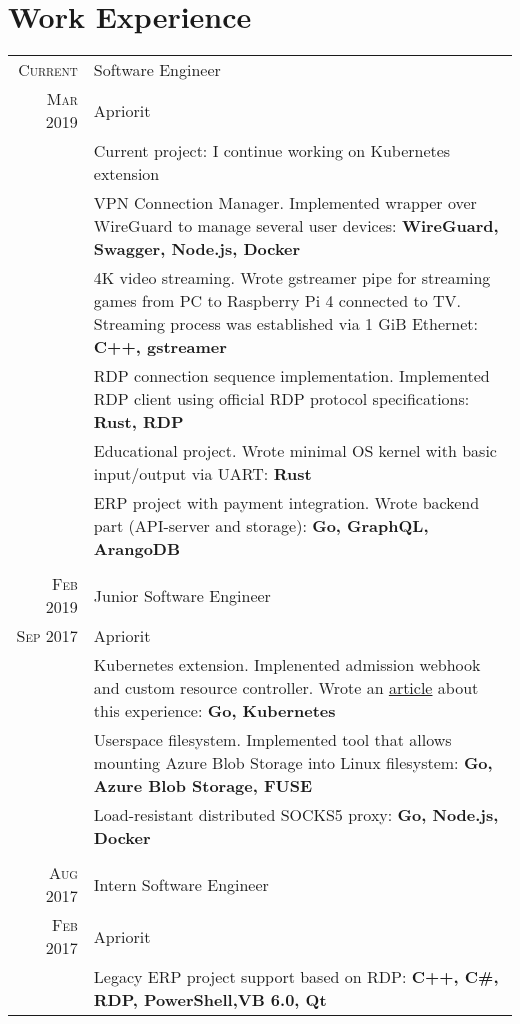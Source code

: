 \documentclass[a4paper,10pt]{article}
\begin{document}
\section{Work Experience}
\begin{tabular}{r|p{11cm}}
\textsc{Current}    & Software Engineer \\
\textsc{Mar} 2019   & Apriorit \\
                    & \footnotesize{Current project: I continue working on Kubernetes extension} \\
                    & \footnotesize{VPN Connection Manager. Implemented wrapper over WireGuard to manage several user devices: \textbf{WireGuard, Swagger, Node.js, Docker}} \\
                    & \footnotesize{4K video streaming. Wrote gstreamer pipe for streaming games from PC to Raspberry Pi 4 connected to TV. Streaming process was established via 1 GiB Ethernet: \textbf{C++, gstreamer}} \\
                    & \footnotesize{RDP connection sequence implementation. Implemented RDP client using official RDP protocol specifications: \textbf{Rust, RDP}} \\    
                    & \footnotesize{Educational project. Wrote minimal OS kernel with basic input/output via UART: \textbf{Rust}} \\
					& \footnotesize{ERP project with payment integration. Wrote backend part (API-server and storage): \textbf{Go, GraphQL, ArangoDB}} \\

\multicolumn{2}{c}{} \\

\textsc{Feb} 2019   & Junior Software Engineer \\
\textsc{Sep} 2017   & Apriorit \\

                    & \footnotesize{Kubernetes extension. Implenented admission webhook and custom resource controller. Wrote an \href{https://www.apriorit.com/dev-blog/624-web-crd-in-kubernetes}{article} about this experience: \textbf{Go, Kubernetes}} \\
					& \footnotesize{Userspace filesystem. Implemented tool that allows mounting Azure Blob Storage into Linux filesystem: \textbf{Go, Azure Blob Storage, FUSE}} \\
                    & \footnotesize{Load-resistant distributed SOCKS5 proxy: \textbf{Go, Node.js, Docker}} \\

\multicolumn{2}{c}{} \\

\textsc{Aug} 2017   & Intern Software Engineer \\
\textsc{Feb} 2017   & Apriorit \\

                    & \footnotesize{Legacy ERP project support based on RDP: \textbf{C++, C\#, RDP, PowerShell,VB 6.0, Qt}} \\                
\end{tabular}
\end{document}
